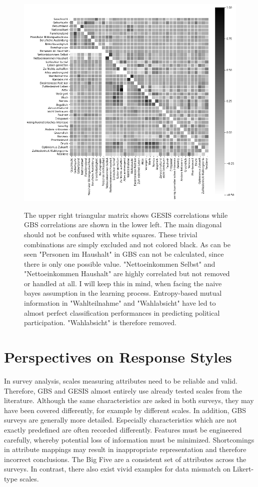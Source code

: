 \begin{figure}[ht]
	\begin{center}
		\captionsetup{width= 400pt}
		\includegraphics[scale=0.73,angle=0]{fig/correl}
		\label{corr}
		\caption{The upper right triangular matrix shows GESIS correlations while GBS correlations are shown in the lower left. The main diagonal should not be confused with white squares. These trivial combinations are simply excluded and not colored black. As can be seen "Personen im Haushalt" in GBS can not be calculated, since there is only one possible value. "Nettoeinkommen Selbst" and "Nettoeinkommen Haushalt" are highly correlated but not removed or handled at all. I will keep this in mind, when facing the naive bayes assumption in the learning process. Entropy-based mutual information in "Wahlteilnahme" and "Wahlabsicht" have led to almost perfect classification performances in predicting political participation. "Wahlabsicht" is therefore removed.}
	\end{center}
\end{figure}

\section{Perspectives on Response Styles}

In survey analysis, scales measuring attributes need to be reliable and valid. Therefore, GBS and GESIS almost entirely use already tested scales from the literature. Although the same characteristics are asked in both surveys, they may have been covered differently, for example by different scales. In addition, GBS surveys are generally more detailed. Especially characteristics which are not exactly predefined are often recorded differently. Features must be engineered carefully, whereby potential loss of information must be minimized. Shortcomings in attribute mappings may result in inappropriate representation and therefore incorrect conclusions. The Big Five are a consistent set of attributes across the surveys. In contrast, there also exist vivid examples for data mismatch on Likert-type scales.


